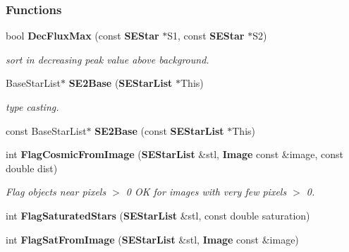\subsubsection*{Functions}
\begin{CompactItemize}
\item 
{}
bool {\bf Dec\-Flux\-Max} (const {\bf SEStar} $\ast$S1, const {\bf SEStar} $\ast$S2)\label{sestar_h_a9}

\begin{CompactList}\small\item\em sort in decreasing peak value above background.\item\end{CompactList}\item 
{}
Base\-Star\-List$\ast$ {\bf SE2Base} ({\bf SEStar\-List} $\ast$This)\label{sestar_h_a10}

\begin{CompactList}\small\item\em type casting.\item\end{CompactList}\item 
{}
const Base\-Star\-List$\ast$ {\bf SE2Base} (const {\bf SEStar\-List} $\ast$This)\label{sestar_h_a11}

\item 
{}
int {\bf Flag\-Cosmic\-From\-Image} ({\bf SEStar\-List} \&stl, {\bf Image} const \&image, const double dist)\label{sestar_h_a12}

\begin{CompactList}\small\item\em Flag objects near pixels $>$ 0 OK for images with very few pixels $>$ 0.\item\end{CompactList}\item 
{}
int {\bf Flag\-Saturated\-Stars} ({\bf SEStar\-List} \&stl, const double saturation)\label{sestar_h_a13}

\item 
{}
int {\bf Flag\-Sat\-From\-Image} ({\bf SEStar\-List} \&stl, {\bf Image} const \&image)\label{sestar_h_a14}


\end{CompactItemize}
